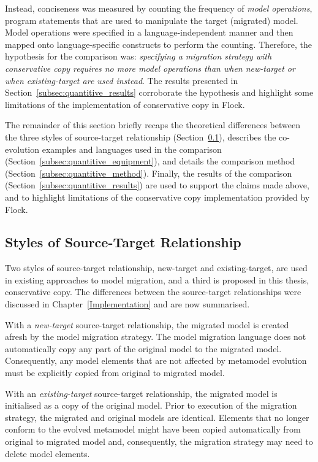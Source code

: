Instead, conciseness was measured by counting the frequency of \emph{model operations}, program statements that are used to manipulate the target (migrated) model. Model operations were specified in a language-independent manner and then mapped onto language-specific constructs to perform the counting. Therefore, the hypothesis for the comparison was: \emph{specifying a migration strategy with conservative copy requires no more model operations than when new-target or when existing-target are used instead}. The results presented in Section~\ref{subsec:quantitive_results} corroborate the hypothesis and highlight some limitations of the implementation of conservative copy in Flock.

The remainder of this section briefly recaps the theoretical differences between the three styles of source-target relationship (Section~\ref{subsec:styles_of_source-target_relationship}), describes the co-evolution examples and languages used in the comparison (Section~\ref{subsec:quantitive_equipment}), and details the comparison method (Section~\ref{subsec:quantitive_method}). Finally, the results of the comparison (Section~\ref{subsec:quantitive_results}) are used to support the claims made above, and to highlight limitations of the conservative copy implementation provided by Flock.


\subsection{Styles of Source-Target Relationship}
\label{subsec:styles_of_source-target_relationship}
Two styles of source-target relationship, new-target and existing-target, are used in existing approaches to model migration, and a third is proposed in this thesis, conservative copy. The differences between the source-target relationships were discussed in Chapter~\ref{Implementation} and are now summarised.

With a \emph{new-target} source-target relationship, the migrated model is created afresh by the model migration strategy. The model migration language does not automatically copy any part of the original model to the migrated model. Consequently, any model elements that are not affected by metamodel evolution must be explicitly copied from original to migrated model.

With an \emph{existing-target} source-target relationship, the migrated model is initialised as a copy of the original model. Prior to execution of the migration strategy, the migrated and original models are identical. Elements that no longer conform to the evolved metamodel might have been copied automatically from original to migrated model and, consequently, the migration strategy may need to delete model elements.

